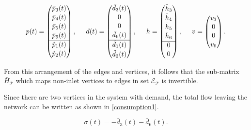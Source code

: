 \begin{equation}
\label{example1_signals_constants}
p(t) =
 \begin{pmatrix} 
 \bar{p}_3(t) \\[1.3pt] 
 \bar{p}_4(t) \\[1.3pt]
 \bar{p}_5(t) \\[1.3pt] 
 \bar{p}_6(t) \\[1.3pt] 
  \hline
 \hat{p}_1(t) \\[1.3pt] 
 \hat{p}_2(t) \\[1.3pt] 
 \end{pmatrix}
 , \hspace{5mm}
 d(t) =  \begin{pmatrix} 
 \bar{d}_3(t) \\[1pt] 
 0 \\[1pt]
 0 \\[1pt] 
 \bar{d}_6(t) \\[1pt] 
  \hline
 \hat{d}_1(t) \\[1pt] 
 \hat{d}_2(t) \\[1pt] 
 \end{pmatrix}
 , \hspace{5mm}
 h =  \begin{pmatrix} 
 \bar{h}_3 \\[1pt] 
 \bar{h}_4 \\[1pt]
 \bar{h}_5 \\[1pt] 
 \bar{h}_6 \\[1pt] 
   \hline
 0 \\[1pt] 
 0 \\[1pt] 
 \end{pmatrix}
 , \hspace{5mm}
 v =  \begin{pmatrix} 
 v_3 \\[1pt] 
 0 \\[1pt]
 0 \\[1pt] 
 v_6 \\[1pt]
 \end{pmatrix}.
\end{equation}

From this arrangement of the edges and vertices, it follows that the sub-matrix $\bar{H}_{\mathcal{T}}$ which maps non-inlet vertices to edges in set $\mathcal{E}_{\mathcal{T}}$ is invertible. 

Since there are two vertices in the system with demand, the total flow leaving the network can be written as shown in \eqref{consumption1}.

\begin{equation}
  \label{consumption1}
  \sigma(t) = -\bar{d}_3(t) - \bar{d}_6(t).
\end{equation}

